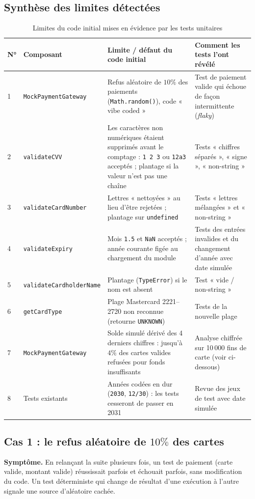 \documentclass[12pt,a4paper]{article}
\begin{document}
\subsection{Synthèse des limites détectées}
\begin{table}[h!]
\centering
\footnotesize
\begin{tabular}{p{0.4cm}p{4.2cm}p{5.0cm}p{4.3cm}}
\toprule
\textbf{N°} & \textbf{Composant} & \textbf{Limite / défaut du code initial} & \textbf{Comment les tests l'ont révélé} \\
\midrule
1 & \texttt{MockPaymentGateway} & Refus aléatoire de $10\%$ des paiements (\texttt{Math.random()}), code « vibe coded » & Test de paiement valide qui échoue de façon intermittente (\textit{flaky}) \\
2 & \texttt{validateCVV} & Les caractères non numériques étaient supprimés avant le comptage : \texttt{1 2 3} ou \texttt{12a3} acceptés ; plantage si la valeur n'est pas une chaîne & Tests « chiffres séparés », « signe », « non-string » \\
3 & \texttt{validateCardNumber} & Lettres « nettoyées » au lieu d'être rejetées ; plantage sur \texttt{undefined} & Tests « lettres mélangées » et « non-string » \\
4 & \texttt{validateExpiry} & Mois \texttt{1.5} et \texttt{NaN} acceptés ; année courante figée au chargement du module & Tests des entrées invalides et du changement d'année avec date simulée \\
5 & \texttt{validateCardholderName} & Plantage (\texttt{TypeError}) si le nom est absent & Test « vide / non-string » \\
6 & \texttt{getCardType} & Plage Mastercard 2221--2720 non reconnue (retourne \texttt{UNKNOWN}) & Tests de la nouvelle plage \\
7 & \texttt{MockPaymentGateway} & Solde simulé dérivé des 4 derniers chiffres : jusqu'à $4\%$ des cartes valides refusées pour fonds insuffisants & Analyse chiffrée sur 10\,000 fins de carte (voir ci-dessous) \\
8 & Tests existants & Années codées en dur (\texttt{2030}, \texttt{12/30}) : les tests cesseront de passer en 2031 & Revue des jeux de test avec date simulée \\
\bottomrule
\end{tabular}
\caption{Limites du code initial mises en évidence par les tests unitaires}
\label{tab:limites}
\end{table}

\subsection{Cas 1 : le refus aléatoire de $10\%$ des cartes}
\textbf{Symptôme.} En relançant la suite plusieurs fois, un test de paiement (carte valide, montant valide) réussissait parfois et échouait parfois, sans modification du code. Un test déterministe qui change de résultat d'une exécution à l'autre signale une source d'aléatoire cachée.
\end{document}
